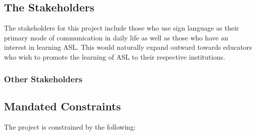 \documentclass[12pt, titlepage]{article}
\begin{document}
\subsection{The Stakeholders}

 The stakeholders for this project include those who use sign language as their primary mode of communication in daily life as well as those who have an interest in learning ASL. This would naturally expand outward towards educators who wish to promote the learning of ASL to their respective institutions. 



\subsubsection{Other Stakeholders}

\subsection{Mandated Constraints}

The project is constrained by the following:
\end{document}
